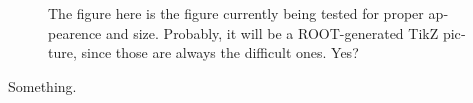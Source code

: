 

\begin{english}


\begin{figure}

\centering
\begin{minipage}[b]{.49\textwidth}
\begin{infilsf} \tiny 

\end{infilsf}
\end{minipage}
\hfill\begin{minipage}[b]{.3\textwidth}
\caption{The figure here is the figure currently being tested for
  proper appearence and size. Probably, it will be a ROOT-generated
  TikZ picture, since those are always the difficult ones. Yes?}
\label{fig:my_label}
\end{minipage}
\end{figure}

Something.

\end{english}
